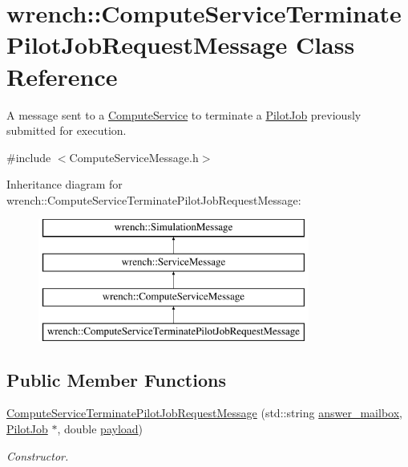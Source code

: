 \hypertarget{classwrench_1_1_compute_service_terminate_pilot_job_request_message}{}\section{wrench\+:\+:Compute\+Service\+Terminate\+Pilot\+Job\+Request\+Message Class Reference}
\label{classwrench_1_1_compute_service_terminate_pilot_job_request_message}


A message sent to a \hyperlink{classwrench_1_1_compute_service}{Compute\+Service} to terminate a \hyperlink{classwrench_1_1_pilot_job}{Pilot\+Job} previously submitted for execution.  




{\ttfamily \#include $<$Compute\+Service\+Message.\+h$>$}

Inheritance diagram for wrench\+:\+:Compute\+Service\+Terminate\+Pilot\+Job\+Request\+Message\+:\begin{figure}[H]
\begin{center}
\leavevmode
\includegraphics[height=4.000000cm]{classwrench_1_1_compute_service_terminate_pilot_job_request_message}
\end{center}
\end{figure}
\subsection*{Public Member Functions}
\begin{DoxyCompactItemize}
\item 
\hyperlink{classwrench_1_1_compute_service_terminate_pilot_job_request_message_adb7dee68b8ac3adb23f9f756c5ca72cd}{Compute\+Service\+Terminate\+Pilot\+Job\+Request\+Message} (std\+::string \hyperlink{classwrench_1_1_compute_service_terminate_pilot_job_request_message_ad4a4be726e0b373411ab2bea6106b6bc}{answer\+\_\+mailbox}, \hyperlink{classwrench_1_1_pilot_job}{Pilot\+Job} $\ast$, double \hyperlink{classwrench_1_1_simulation_message_a914f2732713f7c02898e66f05a7cb8a1}{payload})
\begin{DoxyCompactList}\small\item\em Constructor. \end{DoxyCompactList}\end{DoxyCompactItemize}
